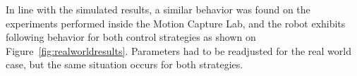 \documentclass[journal]{IEEEtran}
\begin{document}











In line with the simulated results, a similar behavior was found on the experiments performed inside the Motion Capture Lab, and the robot exhibits following behavior for both control strategies as shown on Figure~\ref{fig:realworldresults}.   Parameters had to be readjusted for the real world case, but the same situation occurs for both strategies.   
\end{document}
